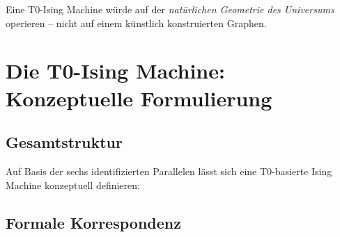 \begin{keyresult}[Parallele 6]
    Eine T0-Ising Machine würde auf der \emph{natürlichen Geometrie des Universums} 
    operieren -- nicht auf einem künstlich konstruierten Graphen.
\end{keyresult}

\clearpage

\section{Die T0-Ising Machine: Konzeptuelle Formulierung}
\label{sec:t0machine}

\subsection{Gesamtstruktur}

Auf Basis der sechs identifizierten Parallelen lässt sich eine T0-basierte 
Ising Machine konzeptuell definieren:

\begin{table}[h]
    \centering
    \caption{Gesamtvergleich: Klassische CIM vs.\ T0-Ising Machine}
    \label{tab:t0machine}
\end{table}

\subsection{Formale Korrespondenz}

